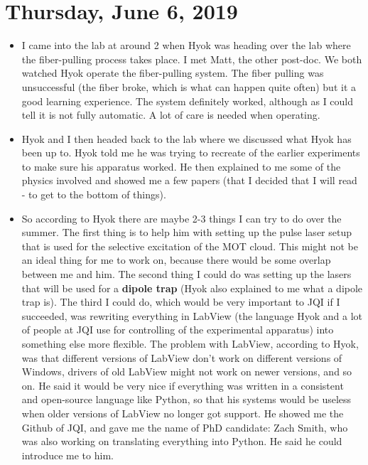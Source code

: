 \documentclass{book}
\theoremstyle{definition}
\begin{document}
\section*{Thursday, June 6, 2019}
	\begin{itemize}
	\item I came into the lab at around 2 when Hyok was heading over the lab where the fiber-pulling process takes place. I met Matt, the other post-doc. We both watched Hyok operate the fiber-pulling system. The fiber pulling was unsuccessful (the fiber broke, which is what can happen quite often) but it a good learning experience. The system definitely worked, although as I could tell it is not fully automatic. A lot of care is needed when operating.
	
	
	\item Hyok and I then headed back to the lab where we discussed what Hyok has been up to. Hyok told me he was trying to recreate of the earlier experiments to make sure his apparatus worked. He then explained to me some of the physics involved and showed me a few papers (that I decided that I will read - to get to the bottom of things). 
	
	
	\item So according to Hyok there are maybe 2-3 things I can try to do over the summer. The first thing is to help him with setting up the pulse laser setup that is used for the selective excitation of the MOT cloud. This might not be an ideal thing for me to work on, because there would be some overlap between me and him. The second thing I could do was setting up the lasers that will be used for a \textbf{dipole trap} (Hyok also explained to me what a dipole trap is). The third I could do, which would be very important to JQI if I succeeded, was rewriting everything in LabView (the language Hyok and a lot of people at JQI use for controlling of the experimental apparatus) into something else more flexible. The problem with LabView, according to Hyok, was that different versions of LabView don't work on different versions of Windows, drivers of old LabView might not work on newer versions, and so on. He said it would be very nice if everything was written in a consistent and open-source language like Python, so that his systems would be useless when older versions of LabView no longer got support. He showed me the Github of JQI, and gave me the name of PhD candidate: Zach Smith, who was also working on translating everything into Python. He said he could introduce me to him.
	

\end{itemize}
\end{document}
